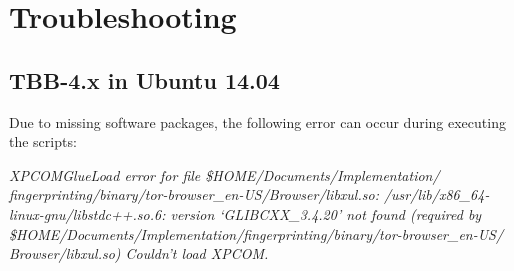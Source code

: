 \section{Troubleshooting}
\label{sec:troubleshooting}

\subsection{\ac{TBB}-4.x in Ubuntu 14.04}
\label{sec:tbb_problem}

Due to missing software packages, the following error can occur during executing the scripts:

\emph{XPCOMGlueLoad error for file \$HOME/Documents/Implementation/}\\
\emph{fingerprinting/binary/tor-browser\_en-US/Browser/libxul.so:
/usr/lib/x86\_64-linux-gnu/libstdc++.so.6: version `GLIBCXX\_3.4.20' not found (required by }\\
\emph{\$HOME/Documents/Implementation/fingerprinting/binary/tor-browser\_en-US/}\\
\emph{Browser/libxul.so)
Couldn't load XPCOM.}

